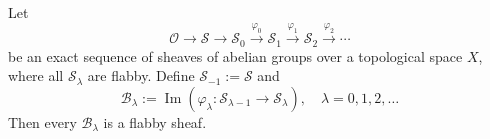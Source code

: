 Let
$$\mathcal{O} \rightarrow \mathcal{S} \rightarrow \mathcal{S}_0 \xrightarrow{\varphi_0} \mathcal{S}_1 \xrightarrow{\varphi_1} \mathcal{S}_2 \xrightarrow{\varphi_2} \cdots$$
be an exact sequence of sheaves of abelian groups over a topological space $X$, where all $\mathcal{S}_{\lambda}$ are flabby. Define $\mathcal{S}_{-1} := \mathcal{S}$ and
$$\mathcal{B}_{\lambda} := \operatorname{Im}(\varphi_{\lambda} : \mathcal{S}_{\lambda-1} \rightarrow \mathcal{S}_{\lambda}), \quad \lambda = 0, 1, 2, \ldots$$
Then every $\mathcal{B}_{\lambda}$ is a flabby sheaf.
